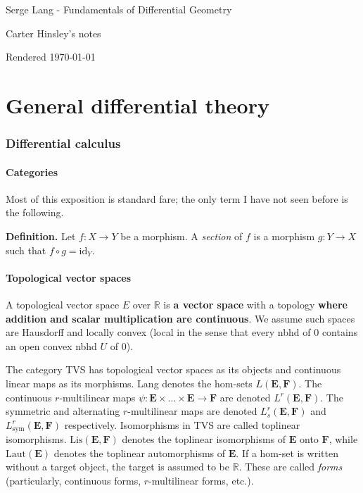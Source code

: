 \documentclass[a4paper]{article}
\newcommand{\R}{\mathbb{R}}
\begin{document}
\begin{center}
\Large{Serge Lang - Fundamentals of Differential Geometry}

\large{Carter Hinsley's notes}

Rendered \today
\end{center}

\part{General differential theory}

\section{Differential calculus}

\subsection{Categories}

Most of this exposition is standard fare; the only term I have not seen before is the following.

\textbf{Definition.} Let $f : X \to Y$ be a morphism. A \emph{section} of $f$ is a morphism $g : Y \to X$ such that $f \circ g = \text{id}_Y$.

\subsection{Topological vector spaces}

A topological vector space $E$ over $\R$ is \textbf{a vector space} with a topology \textbf{where addition and scalar multiplication are continuous}. We assume such spaces are Hausdorff and locally convex (local in the sense that every nbhd of $0$ contains an open convex nbhd $U$ of $0$).

The category TVS has topological vector spaces as its objects and continuous linear maps as its morphisms. Lang denotes the hom-sets $L(\mathbf{E}, \mathbf{F})$. The continuous $r$-multilinear maps $\psi: \mathbf{E} \times \ldots \times \mathbf{E} \to \mathbf{F}$ are denoted $L^r(\mathbf{E}, \mathbf{F})$. The symmetric and alternating $r$-multilinear maps are denoted $L_s^r(\mathbf{E}, \mathbf{F})$ and $L_{\text{sym}}^r(\mathbf{E}, \mathbf{F})$ respectively. Isomorphisms in TVS are called toplinear isomorphisms. $\text{Lis}(\mathbf{E}, \mathbf{F})$ denotes the toplinear isomorphisms of $\mathbf{E}$ onto $\mathbf{F}$, while $\text{Laut}(\mathbf{E})$ denotes the toplinear automorphisms of $\mathbf{E}$. If a hom-set is written without a target object, the target is assumed to be $\R$. These are called \emph{forms} (particularly, continuous forms, $r$-multilinear forms, etc.).
\end{document}
